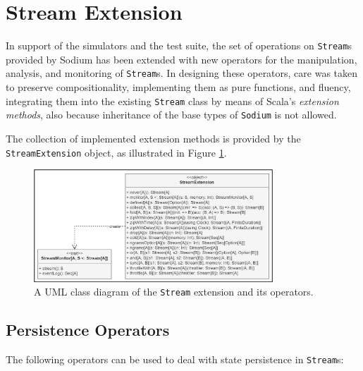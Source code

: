 
\section{Stream Extension}
\label{section:implementation:stream-extension}

In support of the simulators and the test suite, the set of operations on
\texttt{Stream}s provided by Sodium has been extended with new operators for
the manipulation, analysis, and monitoring of \texttt{Stream}s. In designing
these operators, care was taken to preserve compositionality, implementing them
as pure functions, and fluency, integrating them into the existing
\texttt{Stream} class by means of Scala's \textit{extension methods}, also
because inheritance of the base types of \texttt{Sodium} is not allowed.

The collection of implemented extension methods is provided by the
\texttt{StreamEx\-tension} object, as illustrated in Figure
\ref{figure:stream-extension-class-diagram}.

\begin{figure}[!ht]
  \centering
  \includegraphics[width=0.8\textwidth]{resources/figures/stream-extension-class-diagram.png}
  \caption{
    A UML class diagram of the \texttt{Stream} extension
    and its operators.
  }
  \label{figure:stream-extension-class-diagram}
\end{figure}

\subsection{Persistence Operators}

The following operators can be used to deal with state persistence in
\texttt{Stream}s:

